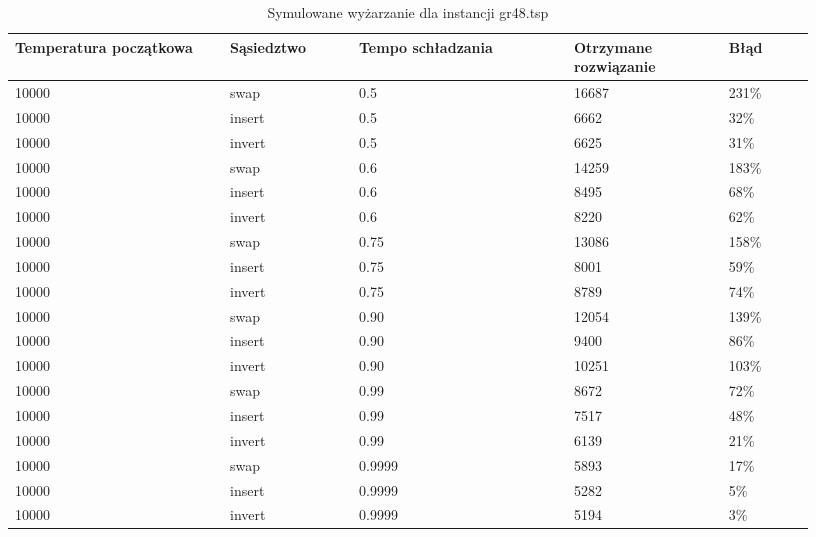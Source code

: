 \documentclass[12pt,a4paper,titlepage]{article}
\begin{document}
\begin{table}[H]
    \centering
	{\begin{tabular}{|p{0.25\linewidth}p{0.15\linewidth}p{0.25\linewidth}p{0.18\linewidth}p{0.1\linewidth}|}
		\hline
        Temperatura początkowa & Sąsiedztwo & Tempo schładzania & Otrzymane rozwiązanie & Błąd \\
		\hline
        10000 & swap&0.5 & 16687 & 231\% \\
        10000 & insert&0.5 & 6662 & 32\% \\
        10000 & invert&0.5 & 6625 & 31\% \\
        \hline
        10000 &swap& 0.6 & 14259 & 183\% \\
        10000 &insert& 0.6 & 8495 & 68\% \\
        10000 &invert& 0.6 & 8220 & 62\% \\
        \hline
        10000 &swap& 0.75 & 13086 & 158\% \\
        10000 &insert& 0.75 & 8001 & 59\% \\
        10000 &invert& 0.75 & 8789 & 74\% \\
        \hline
        10000 &swap& 0.90 & 12054 & 139\% \\
        10000 &insert& 0.90 & 9400 & 86\% \\
        10000 &invert& 0.90 & 10251 & 103\% \\
        \hline
        10000 &swap& 0.99 & 8672 & 72\% \\
        10000 &insert& 0.99 & 7517 & 48\% \\
        10000 &invert& 0.99 & 6139 & 21\% \\
        \hline
        10000 &swap& 0.9999 & 5893 & 17\% \\
        10000 &insert& 0.9999 & 5282 & 5\% \\
        10000 &invert& 0.9999 & 5194 & 3\% \\
        \hline
	\end{tabular}}
	\caption{Symulowane wyżarzanie dla instancji gr48.tsp}
\end{table}
\end{document}
